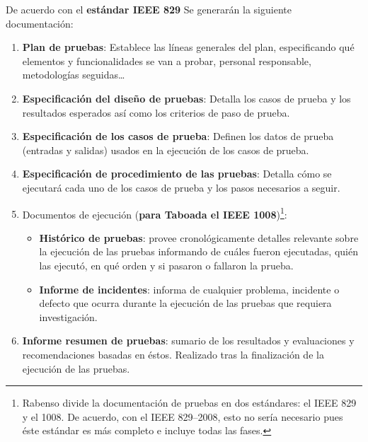De acuerdo con el \textbf{estándar IEEE 829} Se generarán la siguiente documentación:
\begin{enumerate}
    \item \textbf{Plan de pruebas}: Establece las líneas generales del plan, especificando qué elementos y funcionalidades se van a probar, personal responsable, metodologías seguidas\ldots 
    \item \textbf{Especificación del diseño de pruebas}: Detalla los casos de prueba y los resultados esperados así como los criterios de paso de prueba. %

    \item \textbf{Especificación de los casos de prueba}: Definen los datos de prueba (entradas y salidas) usados en la ejecución de los casos de prueba. %
    
    
    \item \textbf{Especificación de procedimiento de las pruebas}: Detalla cómo se ejecutará cada uno de los casos de prueba y los pasos necesarios a seguir.
    
    \item Documentos de ejecución (\textbf{para Taboada el IEEE 1008})\footnote{Rabenso divide la documentación de pruebas en dos estándares: el IEEE 829 y el 1008. De acuerdo, con el IEEE 829--2008, esto no sería necesario pues éste estándar es más completo e incluye todas las fases.}:
    \begin{itemize}
        \item \textbf{Histórico de pruebas}: provee cronológicamente detalles relevante sobre la ejecución de las pruebas informando de cuáles fueron ejecutadas, quién las ejecutó, en qué orden y si pasaron o fallaron la prueba.
        \item \textbf{Informe de incidentes}: informa de cualquier problema, incidente o defecto que ocurra durante la ejecución de las pruebas que requiera investigación.
    \end{itemize}
    \item \textbf{Informe resumen de pruebas}: sumario de los resultados y evaluaciones y recomendaciones basadas en éstos. Realizado tras la finalización de la ejecución de las pruebas.
\end{enumerate}
